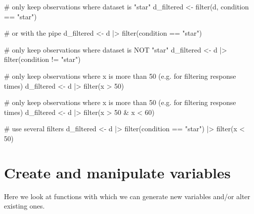 \documentclass[
  letterpaper,
  DIV=11,
  numbers=noendperiod,
  oneside]{scrreprt}
\newenvironment{Shaded}{\begin{snugshade}}{\end{snugshade}}
\newcommand{\CommentTok}[1]{\textcolor[rgb]{0.37,0.37,0.37}{#1}}
\newcommand{\DecValTok}[1]{\textcolor[rgb]{0.68,0.00,0.00}{#1}}
\newcommand{\FunctionTok}[1]{\textcolor[rgb]{0.28,0.35,0.67}{#1}}
\newcommand{\NormalTok}[1]{\textcolor[rgb]{0.00,0.23,0.31}{#1}}
\newcommand{\OtherTok}[1]{\textcolor[rgb]{0.00,0.23,0.31}{#1}}
\newcommand{\SpecialCharTok}[1]{\textcolor[rgb]{0.37,0.37,0.37}{#1}}
\newcommand{\StringTok}[1]{\textcolor[rgb]{0.13,0.47,0.30}{#1}}
\begin{document}
\begin{Shaded}
\begin{Highlighting}[]
\CommentTok{\# only keep observations where dataset is "star"}
\NormalTok{d\_filtered }\OtherTok{\textless{}{-}} \FunctionTok{filter}\NormalTok{(d, condition }\SpecialCharTok{==} \StringTok{"star"}\NormalTok{)}

\CommentTok{\# or with the pipe}
\NormalTok{d\_filtered }\OtherTok{\textless{}{-}}\NormalTok{ d }\SpecialCharTok{|\textgreater{}} \FunctionTok{filter}\NormalTok{(condition }\SpecialCharTok{==} \StringTok{"star"}\NormalTok{)}

\CommentTok{\# only keep observations where dataset is NOT "star"}
\NormalTok{d\_filtered }\OtherTok{\textless{}{-}}\NormalTok{ d }\SpecialCharTok{|\textgreater{}} \FunctionTok{filter}\NormalTok{(condition }\SpecialCharTok{!=} \StringTok{"star"}\NormalTok{)}

\CommentTok{\# only keep observations where x is more than 50 (e.g. for filtering response times)}
\NormalTok{d\_filtered }\OtherTok{\textless{}{-}}\NormalTok{ d }\SpecialCharTok{|\textgreater{}} \FunctionTok{filter}\NormalTok{(x }\SpecialCharTok{\textgreater{}} \DecValTok{50}\NormalTok{)}

\CommentTok{\# only keep observations where x is more than 50 (e.g. for filtering response times)}
\NormalTok{d\_filtered }\OtherTok{\textless{}{-}}\NormalTok{ d }\SpecialCharTok{|\textgreater{}} \FunctionTok{filter}\NormalTok{(x }\SpecialCharTok{\textgreater{}} \DecValTok{50} \SpecialCharTok{\&}\NormalTok{ x }\SpecialCharTok{\textless{}} \DecValTok{60}\NormalTok{)}

\CommentTok{\# use several filters}
\NormalTok{d\_filtered }\OtherTok{\textless{}{-}}\NormalTok{ d }\SpecialCharTok{|\textgreater{}} 
    \FunctionTok{filter}\NormalTok{(condition }\SpecialCharTok{==} \StringTok{"star"}\NormalTok{) }\SpecialCharTok{|\textgreater{}}
    \FunctionTok{filter}\NormalTok{(x }\SpecialCharTok{\textless{}} \DecValTok{50}\NormalTok{)}
\end{Highlighting}
\end{Shaded}

\hypertarget{create-and-manipulate-variables}{%
\section{Create and manipulate
variables}\label{create-and-manipulate-variables}}

Here we look at functions with which we can generate new variables
and/or alter existing ones.
\end{document}
